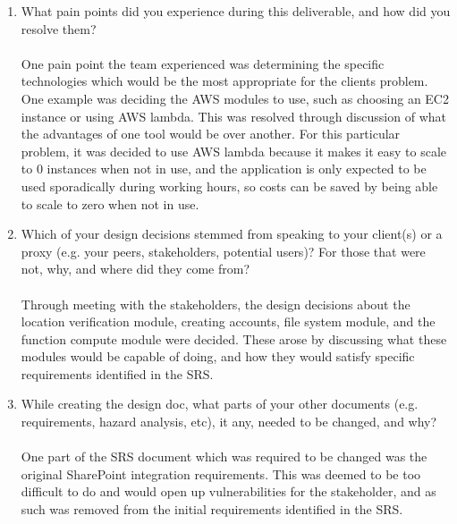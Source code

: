\documentclass[12pt, titlepage]{article}
\begin{document}
{\begin{enumerate}
      \item What pain points did you experience during this deliverable, and how
        did you resolve them?
        \\
        \\
        One pain point the team experienced was determining the specific
        technologies which would be the most appropriate
        for the clients problem. One example was deciding the AWS modules
        to use, such as choosing an EC2 instance or using AWS lambda.
        This was resolved through discussion of what the advantages of one
        tool would be over another. For this particular problem,
        it was decided to use AWS lambda because it makes it easy to scale
        to 0 instances when not in use, and the application is only expected to
        be used sporadically during working hours, so costs can be saved by
        being able to scale to zero when not in use.

      \item Which of your design decisions stemmed from speaking to
        your client(s)
        or a proxy (e.g. your peers, stakeholders, potential users)?
        For those that
        were not, why, and where did they come from?
        \\
        \\
        Through meeting with the stakeholders, the design decisions about
        the location verification module, creating accounts, file system module,
        and the function compute module were decided. These arose by
        discussing what these modules would be capable of doing, and how
        they would satisfy specific
        requirements identified in the SRS.

      \item While creating the design doc, what parts of your other
        documents (e.g.
        requirements, hazard analysis, etc), it any, needed to be
        changed, and why?
        \\
        \\
        One part of the SRS document which was required to be changed was
        the original SharePoint integration requirements. This was deemed
        to be too difficult to do and would open up vulnerabilities for
        the stakeholder, and as such was removed from the initial
        requirements identified in the SRS.


\end{enumerate}}
\end{document}
